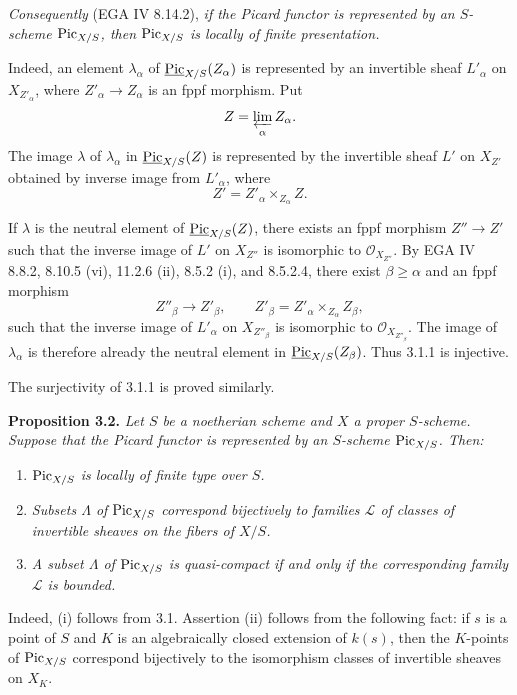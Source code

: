 \emph{Consequently} (EGA IV 8.14.2), \emph{if the Picard functor is
represented by an \(S\)-scheme \(\operatorname{Pic}_{X/S}\), then \(\operatorname{Pic}_{X/S}\) is
locally of finite presentation.}

Indeed, an element \(\lambda_\alpha\) of
\(\underline{\operatorname{Pic}}_{X/S}(Z_\alpha)\) is represented by an invertible sheaf
\(L'_\alpha\) on \(X_{Z'_\alpha}\), where
\(Z'_\alpha\to Z_\alpha\) is an fppf morphism. Put
\[
Z=\varprojlim_\alpha Z_\alpha.
\]
The image \(\lambda\) of \(\lambda_\alpha\) in
\(\underline{\operatorname{Pic}}_{X/S}(Z)\) is represented by the invertible sheaf
\(L'\) on \(X_{Z'}\) obtained by inverse image from \(L'_\alpha\), where
\[
Z'=Z'_\alpha\times_{Z_\alpha}Z.
\]

If \(\lambda\) is the neutral element of
\(\underline{\operatorname{Pic}}_{X/S}(Z)\), there exists an fppf morphism
\(Z''\to Z'\) such that the inverse image of \(L'\) on \(X_{Z''}\) is
isomorphic to \(\mathcal O_{X_{Z''}}\). By EGA IV 8.8.2, 8.10.5 (vi),
11.2.6 (ii), 8.5.2 (i), and 8.5.2.4, there exist
\(\beta\ge\alpha\) and an fppf morphism
\[
Z''_\beta\longrightarrow Z'_\beta,
\qquad
Z'_\beta=Z'_\alpha\times_{Z_\alpha}Z_\beta,
\]
such that the inverse image of \(L'_\alpha\) on \(X_{Z''_\beta}\) is
isomorphic to \(\mathcal O_{X_{Z''_\beta}}\). The image of
\(\lambda_\alpha\) is therefore already the neutral element in
\(\underline{\operatorname{Pic}}_{X/S}(Z_\beta)\). Thus 3.1.1 is injective.

The surjectivity of 3.1.1 is proved similarly.

\textbf{Proposition 3.2.} \emph{Let \(S\) be a noetherian scheme and
\(X\) a proper \(S\)-scheme. Suppose that the Picard functor is
represented by an \(S\)-scheme \(\operatorname{Pic}_{X/S}\). Then:}
\begin{enumerate}[label=(\roman*)]
\item \emph{\(\operatorname{Pic}_{X/S}\) is locally of finite type over \(S\).}
\item \emph{Subsets \(\Lambda\) of \(\operatorname{Pic}_{X/S}\) correspond bijectively
to families \(\mathscr L\) of classes of invertible sheaves on the fibers
of \(X/S\).}
\item \emph{A subset \(\Lambda\) of \(\operatorname{Pic}_{X/S}\) is quasi-compact if
and only if the corresponding family \(\mathscr L\) is bounded.}
\end{enumerate}

Indeed, (i) follows from 3.1. Assertion (ii) follows from the following
fact: if \(s\) is a point of \(S\) and \(K\) is an algebraically closed
extension of \(k(s)\), then the \(K\)-points of \(\operatorname{Pic}_{X/S}\) correspond
bijectively to the isomorphism classes of invertible sheaves on \(X_K\).

